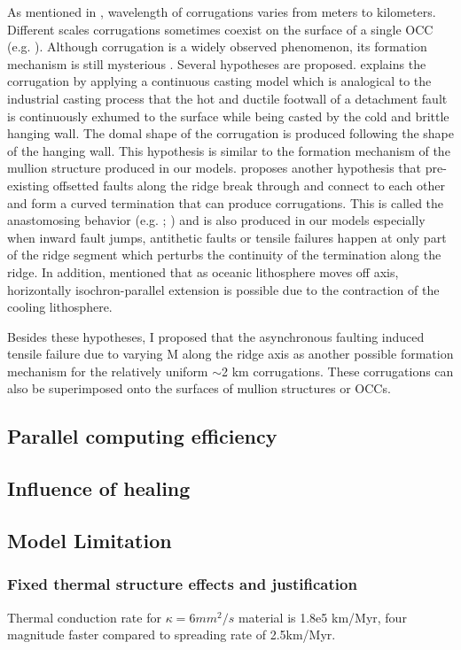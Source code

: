 As mentioned in \citet{Smith2014}, wavelength of corrugations varies from meters to kilometers. Different scales corrugations sometimes coexist on the surface of a single OCC (e.g. \citealp{MacLeod2009}). Although corrugation is a widely observed phenomenon, its formation mechanism is still mysterious \citep{Smith2006}. Several hypotheses are proposed. \citet{Spencer1999} explains the corrugation by applying a continuous casting model which is analogical to the industrial casting process that the hot and ductile footwall of a detachment fault is continuously exhumed to the surface while being casted by the cold and brittle hanging wall. The domal shape of the corrugation is produced following the shape of the hanging wall. This hypothesis is similar to the formation mechanism of the mullion structure produced in our models. \citet{Smith2014} proposes another hypothesis that pre-existing offsetted faults along the ridge break through and connect to each other and form a curved termination that can produce corrugations. This is called the anastomosing behavior (e.g. \citealp{Ferrill1999}; \citealp{Wong2008}) and is also produced in our models especially when inward fault jumps, antithetic faults or tensile failures happen at only part of the ridge segment which perturbs the continuity of the termination along the ridge. In addition, \citet{Tucholke1998} mentioned that %
as oceanic lithosphere moves off axis, horizontally isochron-parallel extension is possible due to the contraction of the cooling lithosphere.

Besides these hypotheses, I proposed that the asynchronous faulting induced tensile failure due to varying M along the ridge axis as another possible formation mechanism for the relatively uniform $\sim$2 km corrugations. These corrugations can also be superimposed onto the surfaces of mullion structures or OCCs.

\iffalse
\subsection{Parallel computing efficiency}
\subsection{Influence of healing}
\subsection{Model Limitation}
\subsubsection{Fixed thermal structure effects and justification}
Thermal conduction rate for $\kappa=6mm^{2}/s$ material is 1.8e5 km/Myr, four magnitude faster compared to spreading rate of 2.5km/Myr.
